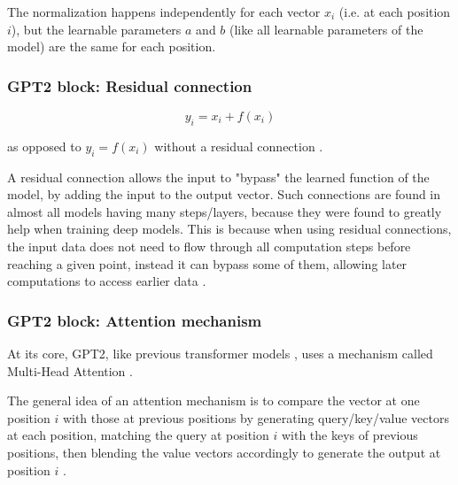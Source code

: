 The normalization happens independently for each vector $x_i$ (i.e. at each position $i$), but the learnable parameters $a$ and $b$ (like all learnable parameters of the model) are the same for each position.

\subsubsection{GPT2 block: Residual connection}

\begin{samepage}

$$y_i = x_i + f(x_i)$$

as opposed to $y_i = f(x_i)$ without a residual connection \cite[p. 3]{allyouneed} \cite{residual}.

A residual connection allows the input to "bypass" the learned function of the model, by adding the input to the output vector.
Such connections are found in almost all models having many steps/layers, because they were found to greatly help when training deep models.
This is because when using residual connections, the input data does not need to flow through all computation steps before reaching a given point, instead it can bypass some of them, allowing later computations to access earlier data .

\end{samepage}

\subsubsection{GPT2 block: Attention mechanism}
\label{gpt2_attn}




At its core, GPT2, like previous transformer models , uses a mechanism called Multi-Head Attention .

The general idea of an attention mechanism is to compare the vector at one position $i$ with those at previous positions by generating query/key/value vectors at each position, matching the query at position $i$ with the keys of previous positions, then blending the value vectors accordingly to generate the output at position $i$ \cite{alammar-transformer} \cite{alammar-gpt2}.

